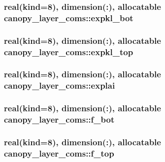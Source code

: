 \subsubsection[{expkl\+\_\+bot}]{\setlength{\rightskip}{0pt plus 5cm}real(kind=8), dimension(\+:), allocatable canopy\+\_\+layer\+\_\+coms\+::expkl\+\_\+bot}\label{namespacecanopy__layer__coms_a97beb2506887f723e41a70d5f75b6a91}
\hypertarget{namespacecanopy__layer__coms_a1759562df86795105d565baca407e299}{}
\subsubsection[{expkl\+\_\+top}]{\setlength{\rightskip}{0pt plus 5cm}real(kind=8), dimension(\+:), allocatable canopy\+\_\+layer\+\_\+coms\+::expkl\+\_\+top}\label{namespacecanopy__layer__coms_a1759562df86795105d565baca407e299}
\hypertarget{namespacecanopy__layer__coms_a5a321ac712c5b4936ce085767be7c552}{}
\subsubsection[{explai}]{\setlength{\rightskip}{0pt plus 5cm}real(kind=8), dimension(\+:), allocatable canopy\+\_\+layer\+\_\+coms\+::explai}\label{namespacecanopy__layer__coms_a5a321ac712c5b4936ce085767be7c552}
\hypertarget{namespacecanopy__layer__coms_aa613df56338fc4f6a370134511c4bb50}{}
\subsubsection[{f\+\_\+bot}]{\setlength{\rightskip}{0pt plus 5cm}real(kind=8), dimension(\+:), allocatable canopy\+\_\+layer\+\_\+coms\+::f\+\_\+bot}\label{namespacecanopy__layer__coms_aa613df56338fc4f6a370134511c4bb50}
\hypertarget{namespacecanopy__layer__coms_af3758ee93625e45577879452859992c8}{}
\subsubsection[{f\+\_\+top}]{\setlength{\rightskip}{0pt plus 5cm}real(kind=8), dimension(\+:), allocatable canopy\+\_\+layer\+\_\+coms\+::f\+\_\+top}\label{namespacecanopy__layer__coms_af3758ee93625e45577879452859992c8}
\hypertarget{namespacecanopy__layer__coms_ac42fff0528a6772261cedc0d1ddf51ed}{}
